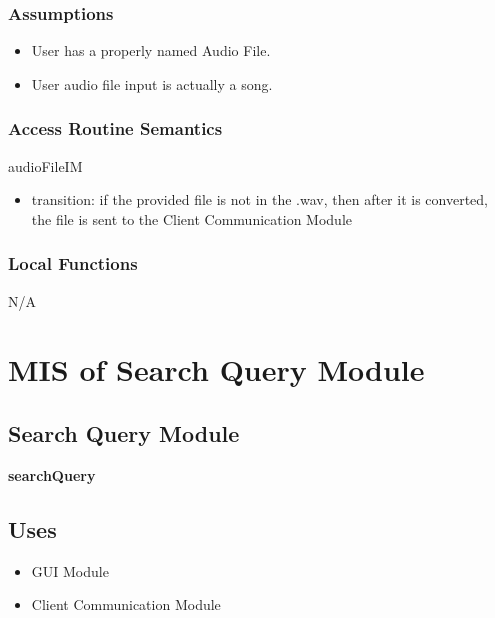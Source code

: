 \documentclass[12pt, titlepage]{article}
\begin{document}
\subsubsection{Assumptions}
\begin{itemize}
  \item User has a properly named Audio File.
  \item User audio file input is actually a song. 
\end{itemize}

\subsubsection{Access Routine Semantics}

\noindent audioFileIM
\begin{itemize}
  \item transition: if the provided file is not in the .wav, then after it is converted, the file is sent to the Client Communication Module 
  \end{itemize}



\subsubsection{Local Functions}
N/A


\section{MIS of Search Query Module} 

\subsection{Search Query Module}
\textbf{searchQuery}
\subsection{Uses}
\begin{itemize}
  \item GUI Module
  \item Client Communication Module
\end{itemize}
\end{document}
